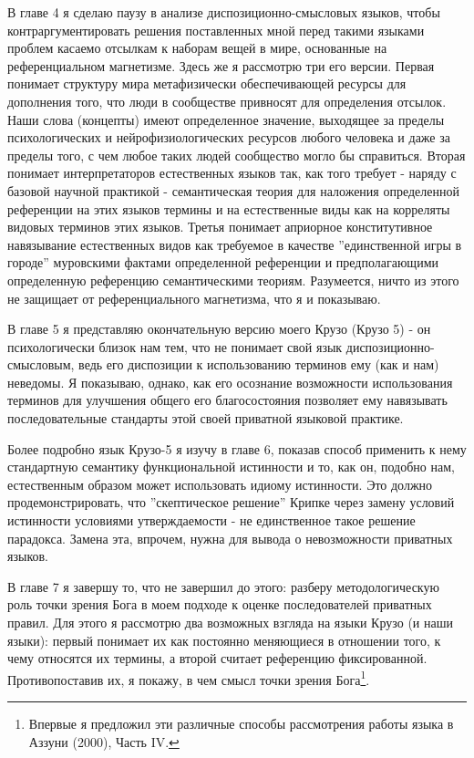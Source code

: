\documentclass[12pt]{book}
\begin{document}
В главе 4 я сделаю паузу в анализе диспозиционно-смысловых языков, чтобы контраргументировать решения поставленных мной перед такими языками проблем касаемо отсылкам к наборам вещей в мире, основанные на референциальном магнетизме. Здесь же я рассмотрю три его версии. Первая понимает структуру мира метафизически обеспечивающей ресурсы для дополнения того, что люди в сообществе привносят для определения отсылок. Наши слова (концепты) имеют определенное значение, выходящее за пределы психологических и нейрофизиологических ресурсов любого человека и даже за пределы того, с чем любое таких людей сообщество могло бы справиться. Вторая понимает интерпретаторов естественных языков так, как того требует - наряду с базовой научной практикой - семантическая теория для наложения определенной референции на этих языков термины и на естественные виды как на корреляты видовых терминов этих языков. Третья понимает априорное конститутивное навязывание естественных видов как требуемое в качестве ''единственной игры в городе'' муровскими фактами определенной референции и предполагающими определенную референцию семантическими теориям. Разумеется, ничто из этого не защищает от референциального магнетизма, что я и показываю.

В главе 5 я представляю окончательную версию моего Крузо (Крузо 5) - он психологически близок нам тем, что не понимает свой язык диспозиционно-смысловым, ведь его диспозиции к использованию терминов ему (как и нам) неведомы. Я показываю, однако, как его осознание возможности использования терминов для улучшения общего его благосостояния позволяет ему навязывать последовательные стандарты этой своей приватной языковой практике.

Более подробно язык Крузо-5 я изучу в главе 6, показав способ применить к нему стандартную семантику функциональной истинности и то, как он, подобно нам, естественным образом может использовать идиому истинности. Это должно продемонстрировать, что ''скептическое решение'' Крипке через замену условий истинности условиями утверждаемости - не единственное такое решение парадокса. Замена эта, впрочем, нужна для вывода о невозможности приватных языков.

В главе 7 я завершу то, что не завершил до этого: разберу методологическую роль точки зрения Бога в моем подходе к оценке последователей приватных правил. Для этого я рассмотрю два возможных взгляда на языки Крузо (и наши языки): первый понимает их как постоянно меняющиеся в отношении того, к чему относятся их термины, а второй считает референцию фиксированной. Противопоставив их, я покажу, в чем смысл точки зрения Бога\footnote{Впервые я предложил эти различные способы рассмотрения работы языка в Аззуни (2000), Часть IV.}.
\end{document}

